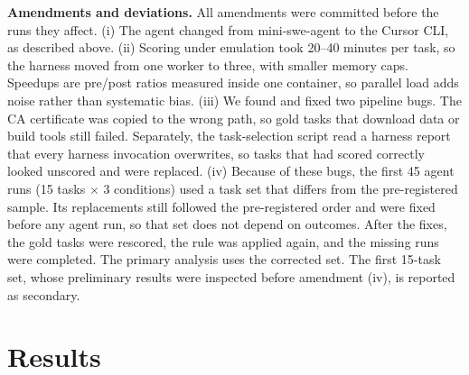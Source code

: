 \documentclass[conference]{IEEEtran}
\begin{document}
\textbf{Amendments and deviations.}
All amendments were committed before the runs they affect. (i) The agent
changed from mini-swe-agent to the Cursor CLI, as described above. (ii)
Scoring under emulation took 20--40 minutes per task, so the harness moved
from one worker to three, with smaller memory caps. Speedups are pre/post
ratios measured inside one container, so parallel load adds noise rather than
systematic bias. (iii) We found and fixed two pipeline bugs. The CA
certificate was copied to the wrong path, so gold tasks that download data or
build tools still failed. Separately, the task-selection script read a
harness report that every harness invocation overwrites, so tasks that had
scored correctly looked unscored and were replaced. (iv) Because of these
bugs, the first 45 agent runs (15 tasks $\times$ 3 conditions) used a task set
that differs from the pre-registered sample. Its replacements still followed
the pre-registered order and were fixed before any agent run, so that set does
not depend on outcomes. After the fixes, the gold tasks were rescored, the
rule was applied again, and the missing runs were completed. The primary
analysis uses the corrected set. The first 15-task set, whose preliminary
results were inspected before amendment (iv), is reported as secondary.

\section{Results}
\label{sec:results}
\end{document}

